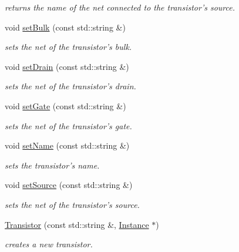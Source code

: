\begin{DoxyCompactItemize}
\begin{DoxyCompactList}\small\item\em returns the name of the net connected to the transistor's source. \end{DoxyCompactList}\item 
void \hyperlink{class_open_chams_1_1_transistor_a1484abe63e3f8ffbc2911c5230fa7091}{set\-Bulk} (const std\-::string \&)
\begin{DoxyCompactList}\small\item\em sets the net of the transistor's bulk. \end{DoxyCompactList}\item 
void \hyperlink{class_open_chams_1_1_transistor_a72ff8491040e3fdc1c8bd62b2392ab82}{set\-Drain} (const std\-::string \&)
\begin{DoxyCompactList}\small\item\em sets the net of the transistor's drain. \end{DoxyCompactList}\item 
void \hyperlink{class_open_chams_1_1_transistor_a705b53a51f0e265533b228f6e8beaf50}{set\-Gate} (const std\-::string \&)
\begin{DoxyCompactList}\small\item\em sets the net of the transistor's gate. \end{DoxyCompactList}\item 
void \hyperlink{class_open_chams_1_1_transistor_a36c59a26f0317be12cea01f8dea24ec7}{set\-Name} (const std\-::string \&)
\begin{DoxyCompactList}\small\item\em sets the transistor's name. \end{DoxyCompactList}\item 
void \hyperlink{class_open_chams_1_1_transistor_abc4a5d86e639ea13e27551722e2f9c17}{set\-Source} (const std\-::string \&)
\begin{DoxyCompactList}\small\item\em sets the net of the transistor's source. \end{DoxyCompactList}\item 
\hyperlink{class_open_chams_1_1_transistor_a5052d5c281f8798a0b10ebfe4c0296a5}{Transistor} (const std\-::string \&, \hyperlink{class_open_chams_1_1_instance}{Instance} $\ast$)
\begin{DoxyCompactList}\small\item\em creates a new transistor. \end{DoxyCompactList}\end{DoxyCompactItemize}



